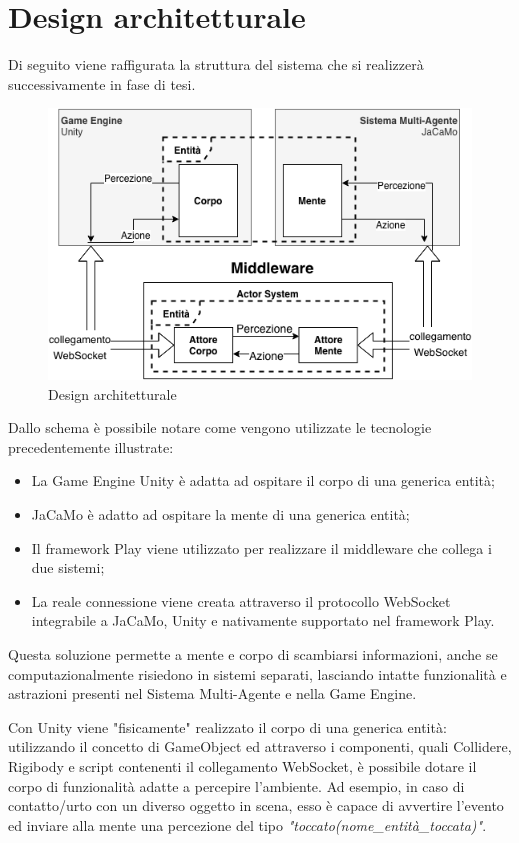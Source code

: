 \chapter{Design architetturale}

Di seguito viene raffigurata la struttura del sistema che si realizzerà successivamente in fase di tesi.

\begin{figure}[H]
\centering
\includegraphics[width=\textwidth]{figures/Synapsis.png}
\caption{Design architetturale}
\end{figure}

Dallo schema è possibile notare come vengono utilizzate le tecnologie precedentemente illustrate:
\begin{itemize}
    \item La Game Engine Unity è adatta ad ospitare il corpo di una generica entità;
    \item JaCaMo è adatto ad ospitare la mente di una generica entità;
    \item Il framework Play viene utilizzato per realizzare il middleware che collega i due sistemi;
    \item La reale connessione viene creata attraverso il protocollo WebSocket integrabile a JaCaMo, Unity e nativamente supportato nel framework Play.
\end{itemize}

Questa soluzione permette a mente e corpo di scambiarsi informazioni, anche se computazionalmente risiedono in sistemi separati, lasciando intatte funzionalità e astrazioni presenti nel Sistema Multi-Agente e nella Game Engine.

\medskip

Con Unity viene "fisicamente" realizzato il corpo di una generica entità: utilizzando il concetto di GameObject ed attraverso i componenti, quali Collidere, Rigibody e script contenenti il collegamento WebSocket, è possibile dotare il corpo di funzionalità adatte a percepire l'ambiente. Ad esempio, in caso di contatto/urto con un diverso oggetto in scena, esso è capace di avvertire l'evento ed inviare alla mente una percezione del tipo \textit{"toccato(nome\_entità\_toccata)"}. 

